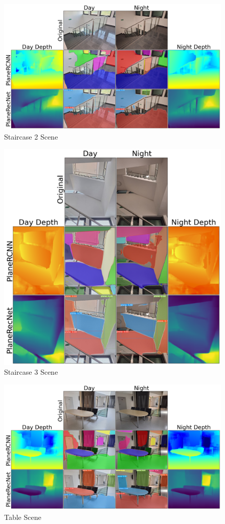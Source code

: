 \begin{figure}[H]
    \centering
    \includegraphics[width=1.0\textwidth]{images/results/Staircase_2.png}
    \caption{Staircase 2 Scene}
    \label{figure:Staircase_2}
\end{figure}

\begin{figure}[H]
    \centering
    \includegraphics[width=1.0\textwidth]{images/results/Staircase_3.png}
    \caption{Staircase 3 Scene}
    \label{figure:Staircase_3}
\end{figure}

\begin{figure}[H]
    \centering
    \includegraphics[width=1.0\textwidth]{images/results/Table.png}
    \caption{Table Scene}
    \label{figure:Table}
\end{figure}

